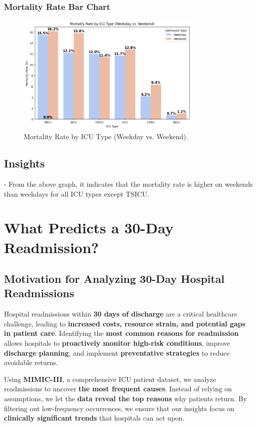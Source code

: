 \documentclass[a4paper,10pt]{article}
\begin{document}
\subsubsection{Mortality Rate Bar Chart}
\begin{figure}[h]
    \centering
    \includegraphics[width=0.8\textwidth]{figure2.png}
    \caption{Mortality Rate by ICU Type (Weekday vs. Weekend).}
    \label{fig:weekend_effect}
\end{figure}

\subsection{Insights}
- From the above graph, it indicates that the mortality rate is higher on weekends than weekdays for all ICU types except TSICU.

\section{What Predicts a 30-Day Readmission?}

\subsection{Motivation for Analyzing 30-Day Hospital Readmissions}
Hospital readmissions within \textbf{30 days of discharge} are a critical healthcare challenge, leading to \textbf{increased costs, resource strain, and potential gaps in patient care}. Identifying the \textbf{most common reasons for readmission} allows hospitals to \textbf{proactively monitor high-risk conditions}, improve \textbf{discharge planning}, and implement \textbf{preventative strategies} to reduce avoidable returns.

Using \textbf{MIMIC-III}, a comprehensive ICU patient dataset, we analyze readmissions to uncover \textbf{the most frequent causes}. Instead of relying on assumptions, we let the \textbf{data reveal the top reasons} why patients return. By filtering out low-frequency occurrences, we ensure that our insights focus on \textbf{clinically significant trends} that hospitals can act upon.
\end{document}
